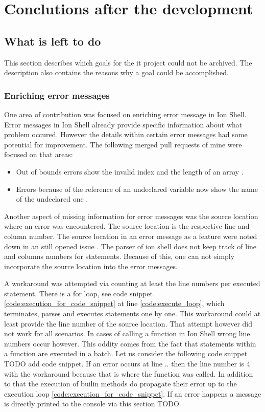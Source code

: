 \chapter{Conclutions after the development}

\section{What is left to do}

This section describes which goals for the it project could not be archived.
The description also contains the reasons why a goal could be accomplished.

\subsection{Enriching error messages}

One area of contribution was focused on enriching error message in Ion Shell.
Error messages in Ion Shell already provide specific information about what problem occured.
However the details within certain error messages had some potential for improvement.
The following merged pull requests of mine were focused on that areas:

\begin{itemize}
	\item Out of bounds errors show the invalid index and the length of an array \cite{pr_error_message_shows_invalid_range}.
	\item Errors because of the reference of an undeclared variable now show the name of the undeclared one \cite{pr_better_not_found_variable_show}.
\end{itemize}

Another aspect of missing information for error messages was the source location where an error was encountered.
The source location is the respective line and column number.
The source location in an error message as a feature were noted down in an still opened issue \cite{issue_enrich_error_message_information}.
The parser of ion shell does not keep track of line and columns numbers for statements.
Because of this, one can not simply incorporate the source location into the error messages.

A workaround was attempted via counting at least the line numbers per executed statement.
There is a for loop, see code snippet \ref{code:execution_for_code_snippet} at line \ref{code:execute_loop},
which terminates, parses and executes statements one by one.
This workaround could at least provide the line number of the source location.
That attempt however did not work for all scenarios.
In cases of calling a function in Ion Shell wrong line numbers occur however.
This oddity comes from the fact that statements within a function are executed in a batch.
Let us consider the following code snippet TODO add code snippet.
If an error occurs at line .. then the line number is 4 with the workaround because that is where the function was called.
In addition to that the execution of builin methods do propagate their error up to the execution loop \ref{code:execution_for_code_snippet}.
If an error happens a message is directly printed to the console via this section TODO.

